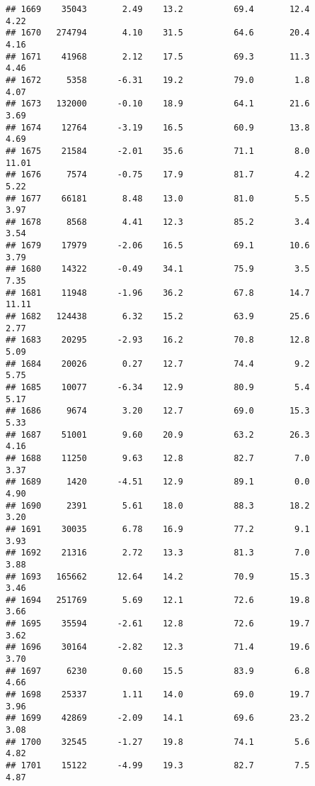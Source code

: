 \documentclass[
]{article}
\begin{document}
\begin{verbatim}
## 1669    35043       2.49    13.2          69.4       12.4              4.22
## 1670   274794       4.10    31.5          64.6       20.4              4.16
## 1671    41968       2.12    17.5          69.3       11.3              4.46
## 1672     5358      -6.31    19.2          79.0        1.8              4.07
## 1673   132000      -0.10    18.9          64.1       21.6              3.69
## 1674    12764      -3.19    16.5          60.9       13.8              4.69
## 1675    21584      -2.01    35.6          71.1        8.0             11.01
## 1676     7574      -0.75    17.9          81.7        4.2              5.22
## 1677    66181       8.48    13.0          81.0        5.5              3.97
## 1678     8568       4.41    12.3          85.2        3.4              3.54
## 1679    17979      -2.06    16.5          69.1       10.6              3.79
## 1680    14322      -0.49    34.1          75.9        3.5              7.35
## 1681    11948      -1.96    36.2          67.8       14.7             11.11
## 1682   124438       6.32    15.2          63.9       25.6              2.77
## 1683    20295      -2.93    16.2          70.8       12.8              5.09
## 1684    20026       0.27    12.7          74.4        9.2              5.75
## 1685    10077      -6.34    12.9          80.9        5.4              5.17
## 1686     9674       3.20    12.7          69.0       15.3              5.33
## 1687    51001       9.60    20.9          63.2       26.3              4.16
## 1688    11250       9.63    12.8          82.7        7.0              3.37
## 1689     1420      -4.51    12.9          89.1        0.0              4.90
## 1690     2391       5.61    18.0          88.3       18.2              3.20
## 1691    30035       6.78    16.9          77.2        9.1              3.93
## 1692    21316       2.72    13.3          81.3        7.0              3.88
## 1693   165662      12.64    14.2          70.9       15.3              3.46
## 1694   251769       5.69    12.1          72.6       19.8              3.66
## 1695    35594      -2.61    12.8          72.6       19.7              3.62
## 1696    30164      -2.82    12.3          71.4       19.6              3.70
## 1697     6230       0.60    15.5          83.9        6.8              4.66
## 1698    25337       1.11    14.0          69.0       19.7              3.96
## 1699    42869      -2.09    14.1          69.6       23.2              3.08
## 1700    32545      -1.27    19.8          74.1        5.6              4.82
## 1701    15122      -4.99    19.3          82.7        7.5              4.87

\end{verbatim}
\end{document}
